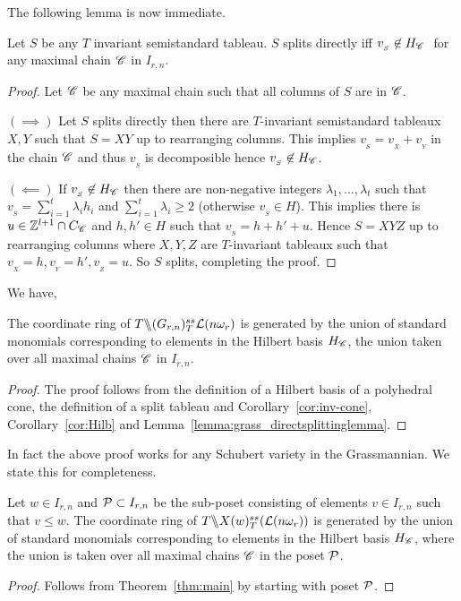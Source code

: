 The following lemma is now immediate.
\begin{lemma}
    \label{lemma:grass_directsplittinglemma}
    Let \(S\) be any \(T\) invariant semistandard tableau. \(S\) splits directly iff \(v_{_S} \not\in H_{\SC}\ \) for any maximal chain $\mathscr{C}$ in \(I_{r,n}\).
\end{lemma}
\begin{proof} 
    Let \(\mathscr{C}\) be any maximal chain such that all columns of \(S\) are in \(\mathscr{C}\).

    \((\implies)\)
    Let \(S\) splits directly then there are \(T\)-invariant semistandard tableaux \(X,Y\) such that 
    \(S = XY\) up to rearranging columns. 
    This implies \(v_{_S} = v_{_X} + v_{_Y}\) in the chain \(\mathscr{C}\) 
    and thus \(v_{_S}\) is decomposible hence \(v_{_S} \not\in H_{\mathscr{C}}\).

    \((\impliedby)\) If \(v_{_S} \not\in H_{\mathscr{C}}\) then there are non-negative integers 
    \(\lambda_1,...,\lambda_t\) such that \(v_{_S} = \sum_{i=1}^t \lambda_i h_i\) and \(\sum_{i=1}^t \lambda_i \ge 2\) (otherwise \(v_{_S} \in H\)). 
    This implies there is \(u\in \mathbb{Z}^{l+1}\cap C_{\mathscr{C}} \) and \(h,h' \in H\) 
    such that \(v_{_S} = h + h' + u\). Hence \(S = XYZ\) up to rearranging columns where \(X,Y,Z\) are \(T\)-invariant tableaux such that \(v_{_X}=h,v_{_Y}=h',v_{_Z}=u\).   So $S$ splits, completing the proof.
\end{proof}

We have,
\begin{theorem}
\label{thm:main}
    The coordinate ring of \(T \backslash\mkern-6mu\backslash (G_{{r},{n}})^{ss}_T{{\cal L}(n\omega_r)}\) is generated by the union of standard monomials corresponding to elements in the Hilbert basis $H_{\mathscr{C}}$, the union taken over all maximal chains $\mathscr{C}$ in \(I_{r,n}\).
\end{theorem}
\begin{proof}
The proof follows from the definition of a Hilbert basis of a polyhedral cone, the definition of a split tableau and Corollary~\ref{cor:inv-cone}, Corollary~\ref{cor:Hilb} and Lemma~\ref{lemma:grass_directsplittinglemma}.

\end{proof}

In fact the above proof works for any Schubert variety in the Grassmannian. We state this for completeness.
\begin{corollary}
\label{cor:schub}
    Let \(w \in I_{r,n}\) and \({\cal P}\subset I_{r,n}\) be the sub-poset consisting of elements $v \in I_{r,n}$ such that $v \leq w$. The coordinate ring of \(T \backslash\mkern-6mu\backslash X(w)^{ss}_T({\cal L}(n\omega_r))\) is generated by the union of standard monomials corresponding to elements in the Hilbert basis $H_{\mathscr{C}}$, where the union is taken over all maximal chains $\mathscr{C}$ in the poset \({\cal P}\).
\end{corollary}
\begin{proof}
    Follows from Theorem~\ref{thm:main} by starting with poset \({\cal P}\).
\end{proof}

